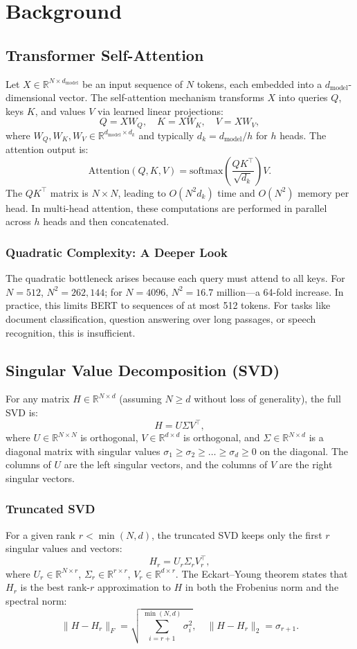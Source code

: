 \documentclass[twocolumn]{article}
\begin{document}
\section{Background}
\subsection{Transformer Self-Attention}
Let $X \in \mathbb{R}^{N \times d_{\text{model}}}$ be an input sequence of $N$ tokens, each embedded into a $d_{\text{model}}$-dimensional vector. The self-attention mechanism transforms $X$ into queries $Q$, keys $K$, and values $V$ via learned linear projections:
\[
Q = X W_Q,\quad K = X W_K,\quad V = X W_V,
\]
where $W_Q, W_K, W_V \in \mathbb{R}^{d_{\text{model}} \times d_k}$ and typically $d_k = d_{\text{model}} / h$ for $h$ heads. The attention output is:
\[
\text{Attention}(Q,K,V) = \text{softmax}\left( \frac{Q K^\top}{\sqrt{d_k}} \right) V.
\]
The $QK^\top$ matrix is $N \times N$, leading to $O(N^2 d_k)$ time and $O(N^2)$ memory per head. In multi-head attention, these computations are performed in parallel across $h$ heads and then concatenated.

\subsubsection{Quadratic Complexity: A Deeper Look}
The quadratic bottleneck arises because each query must attend to all keys. For $N=512$, $N^2 = 262,144$; for $N=4096$, $N^2 = 16.7$ million—a 64-fold increase. In practice, this limits BERT to sequences of at most 512 tokens. For tasks like document classification, question answering over long passages, or speech recognition, this is insufficient.

\subsection{Singular Value Decomposition (SVD)}
For any matrix $H \in \mathbb{R}^{N \times d}$ (assuming $N \ge d$ without loss of generality), the full SVD is:
\[
H = U \Sigma V^\top,
\]
where $U \in \mathbb{R}^{N \times N}$ is orthogonal, $V \in \mathbb{R}^{d \times d}$ is orthogonal, and $\Sigma \in \mathbb{R}^{N \times d}$ is a diagonal matrix with singular values $\sigma_1 \ge \sigma_2 \ge \dots \ge \sigma_d \ge 0$ on the diagonal. The columns of $U$ are the left singular vectors, and the columns of $V$ are the right singular vectors.

\subsubsection{Truncated SVD}
For a given rank $r < \min(N,d)$, the truncated SVD keeps only the first $r$ singular values and vectors:
\[
H_r = U_r \Sigma_r V_r^\top,
\]
where $U_r \in \mathbb{R}^{N \times r}$, $\Sigma_r \in \mathbb{R}^{r \times r}$, $V_r \in \mathbb{R}^{d \times r}$. The Eckart–Young theorem states that $H_r$ is the best rank-$r$ approximation to $H$ in both the Frobenius norm and the spectral norm:
\[
\| H - H_r \|_F = \sqrt{\sum_{i=r+1}^{\min(N,d)} \sigma_i^2}, \quad
\| H - H_r \|_2 = \sigma_{r+1}.
\]
\end{document}
